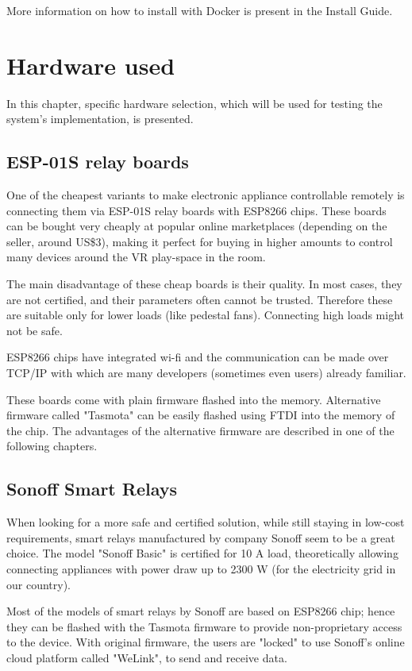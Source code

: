 More information on how to install with Docker is present in the Install Guide.

\hypertarget{x-hardware-used}{\section{Hardware used}}
In this chapter, specific hardware selection, which will be used for testing the
system’s implementation, is presented.


\hypertarget{x-esp-01s-relay-boards}{\subsection{ESP-01S relay boards}}
One of the cheapest variants to make electronic appliance controllable
remotely is connecting them via ESP-01S relay boards with ESP8266 chips.
These boards can be bought very cheaply at popular online marketplaces
(depending on the seller, around US\$3), making it perfect for buying in
higher amounts to control many devices around the VR play-space in the room.


The main disadvantage of these cheap boards is their quality. In most cases,
they are not certified, and their parameters often cannot be trusted. Therefore
these are suitable only for lower loads (like pedestal fans). Connecting high
loads might not be safe.


ESP8266 chips have integrated wi-fi and the communication can be made over
TCP/IP with which are many developers (sometimes even users) already familiar.


These boards come with plain firmware flashed into the memory. Alternative
firmware called "Tasmota" can be easily flashed using FTDI into the memory
of the chip. The advantages of the alternative firmware are described
in one of the following chapters.


\hypertarget{x-sonoff-smart-relays}{\subsection{Sonoff Smart Relays}}
When looking for a more safe and certified solution, while still staying in
low-cost requirements, smart relays manufactured by company Sonoff
seem to be a great choice. The model "Sonoff Basic" is certified for 10 A load,
theoretically allowing connecting appliances with power draw up to 2300 W (for the
electricity grid in our country).


Most of the models of smart relays by Sonoff are based on ESP8266 chip;
hence they can be flashed with the Tasmota firmware to provide non-proprietary
access to the device. With original firmware, the users are "locked" to use
Sonoff’s online cloud platform called "WeLink", to send and receive data.


